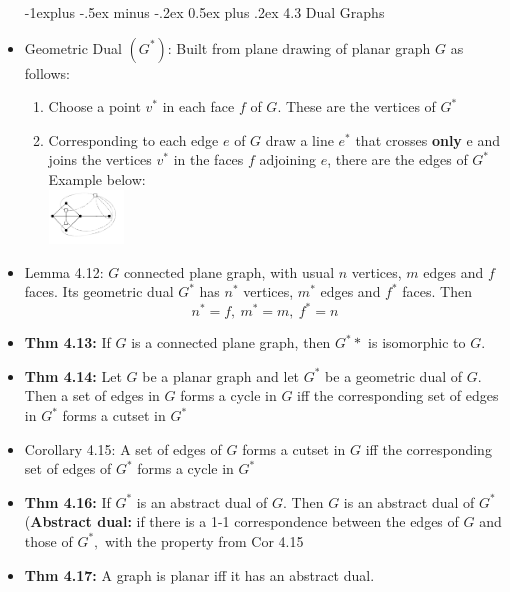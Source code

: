 \documentclass[10pt,landscape]{article}
\makeatletter
\renewcommand{\subsection}{\@startsection{subsection}{2}{0mm}%
                                {-1explus -.5ex minus -.2ex}%
                                {0.5ex plus .2ex}%
                                {\normalfont\normalsize\bfseries}}
\makeatother
\begin{document}
\begin{multicols}{2}
\begin{itemize}
    \subsection{4.3 Dual Graphs}
    \item Geometric Dual $(G^*)$: Built from plane drawing of planar graph $G$ as follows:
    \begin{enumerate}
        \item Choose a point $v^*$ in each face $f$ of $G$. These are the vertices of $G^*$
        \item Corresponding to each edge $e$ of $G$ draw a line $e^*$ that crosses \textbf{only} e and joins the vertices $v^*$ in the faces $f$ adjoining $e$, there are the edges of $G^*$ Example below:\\
        \includegraphics[width = 2cm]{GeomDual.png}
    \end{enumerate}
    \item Lemma 4.12: $G$ connected plane graph, with usual $n$ vertices, $m$ edges and $f$ faces. Its geometric dual $G^*$ has $n^*$ vertices, $m^*$ edges and $f^*$ faces. Then \\
    $$n^*=f,\ m^*=m, \ f^*=n$$
    \item \textbf{Thm 4.13:} If $G$ is a connected plane graph, then $G^**$ is isomorphic to $G$.
    \item \textbf{Thm 4.14:} Let $G$ be a planar graph and let $G^*$ be a geometric dual of $G$. Then a set of edges in $G$ forms a cycle in $G$ iff the corresponding set of edges in $G^*$ forms a cutset in $G^*$
    \item Corollary 4.15: A set of edges of $G$ forms a cutset in $G$ iff the corresponding set of edges of $G^*$ forms a cycle in $G^*$
    \item \textbf{Thm 4.16:} If $G^*$ is an abstract dual of $G.$ Then $G$ is an abstract dual of $G^*$ (\textbf{Abstract dual:} if there is a 1-1 correspondence between the edges of $G$ and those of $G^*,$ with the property from Cor 4.15
    \item \textbf{Thm 4.17:} A graph is planar iff it has an abstract dual.


\end{itemize}
\end{multicols}
\end{document}
